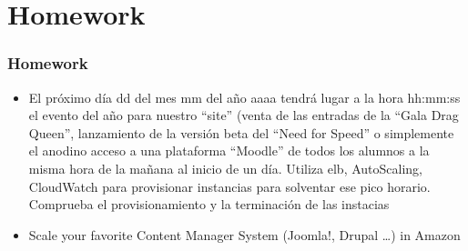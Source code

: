 \documentclass{beamer}
\begin{document}
\section{Homework}
\begin{frame}[fragile]
\frametitle{Homework}
\begin{itemize}
\item El próximo día dd del mes mm del año aaaa tendrá lugar a la hora hh:mm:ss el evento del año para nuestro ``site'' (venta de las entradas de la
``Gala Drag Queen'', lanzamiento de la versión beta del ``Need for Speed'' o simplemente el anodino acceso a una plataforma ``Moodle'' de todos los alumnos a la misma hora de la mañana al inicio de un día. 
Utiliza \acrshort{elb}, AutoScaling, CloudWatch para provisionar instancias para solventar ese pico horario. Comprueba el provisionamiento y la terminación de las instacias

\item Scale your favorite Content Manager System (Joomla!, Drupal \dots) in Amazon
\end{itemize}
\end{frame}
\end{document}
